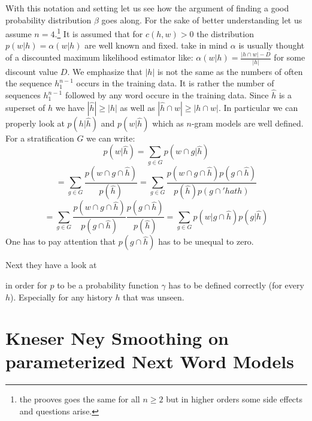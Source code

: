 \documentclass[•]{book}
\begin{document}
\begin{appendix}
With this notation and setting let us see how the argument of finding a good probability distribution $\beta$ goes along. 
For the sake of better understanding let us assume $n=4$.\footnote{the prooves goes the same for all $n\geq 2$ but in higher orders some side effects and questions arise.}
It is assumed that for $c(h,w)>0$ the distribution $p(w|h)=\alpha(w|h)$ are well known and fixed. 
take in mind $\alpha$ is usually thought of a discounted maximum likelihood estimator like: $\alpha(w|h)=\frac{|h \cap w|-D}{|h|}$ for some discount value $D$.
We emphasize that $|h|$ is not the same as the numbers of often the sequence $h_1^{n-1}$ occurs in the training data.
It is rather the number of sequences $h_1^{n-1}$ followed by any word occure in the training data. 
Since $\hat h$ is a superset of $h$ we have $|\hat h| \geq |h|$ as well as $|\hat h \cap w| \geq |h \cap w|$.
In particular we can properly look at $p(h|\hat h)$ and $p(w|\hat h)$ which as $n$-gram models are well defined.
For a stratification $G$ we can write: 
\[
p(w|\hat h) = \sum_{g\in G}p(w\cap g|\hat h)
\]
\[
=\sum_{g\in G}\frac{p(w \cap g \cap \hat h)}{p(\hat h)}=\sum_{g\in G}\frac{p(w \cap g \cap \hat h)p(g \cap \hat h)}{p(\hat h)p(g \cap 'hat h)}
\]
\[
=\sum_{g\in G}\frac{p(w \cap g \cap \hat h)}{p(g\cap \hat h)}\frac{p(g\cap\hat h)}{p(\hat h)} = \sum_{g\in G}p(w|g\cap \hat h)p(g|\hat h)
\]
One has to pay attention that $p(g\cap \hat h)$ has to be unequal to zero. 

Next they have a look at 

in order for $p$ to be a probability function $\gamma$ has to be defined correctly (for every $h$). 
Especially for any history $h$ that was unseen. 

\section{Kneser Ney Smoothing on parameterized Next Word Models}

\end{appendix}



\end{document}
